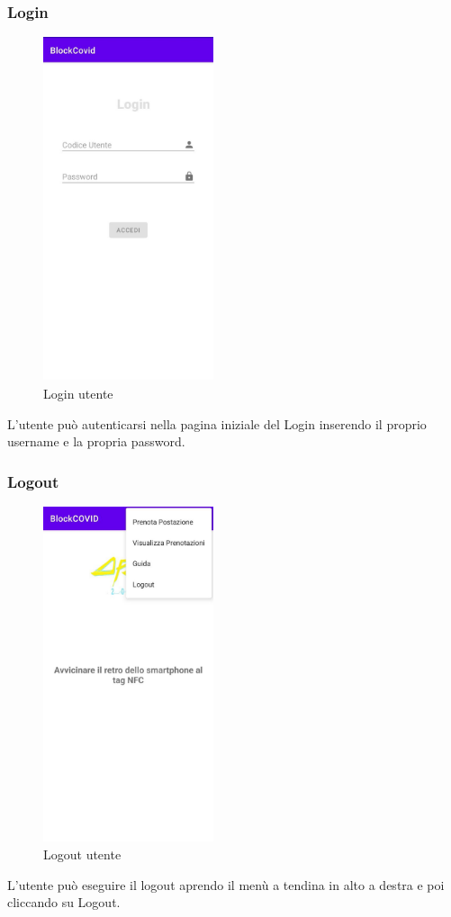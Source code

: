 \subsubsection{Login}
\begin{figure}[H]
	\centering
	\includegraphics[width=5cm]{res/images/login.png}
	\caption{Login utente}
\end{figure}
L'utente può autenticarsi nella pagina iniziale del Login inserendo il proprio username e la propria password. 

\subsubsection{Logout}
\begin{figure}[H]
	\centering
	\includegraphics[width=5cm]{res/images/menuATendina.png}
	\caption{Logout utente}
\end{figure}
L'utente può eseguire il logout aprendo il menù a tendina in alto a destra e poi cliccando su Logout.

